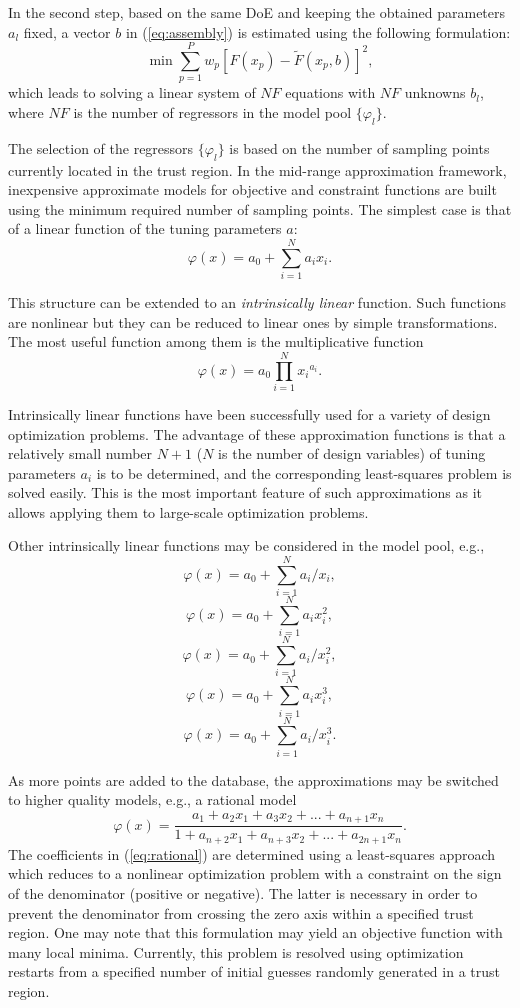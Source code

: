 \documentclass[runningheads,a4paper]{llncs}
\begin{document}
In the second step, based on the same DoE and keeping the obtained parameters
$a_l$ fixed, a vector $b$ in (\ref{eq:assembly}) is estimated using the
following formulation:
\[
\min \sum_{p=1}^P{w_{p}\left[ F(x_p)- \widetilde{F}(x_p,b) \right]^2},
\]
which leads to solving a linear system of $NF$ equations with $NF$ unknowns
$b_l$, where $NF$ is the number of regressors in the model pool
$\{\varphi_l\}$.

The selection of the regressors $\{\varphi_l\}$ is based on the number of
sampling points currently located in the trust region. In the mid-range
approximation framework, inexpensive approximate models for objective and
constraint functions are built using the minimum required number of sampling
points. The simplest case is that of a linear function of the tuning parameters
$a$:
\[
\varphi(x) = a_0 + \sum_{i=1}^N{a_i x_i}.
\]

This structure can be extended to an \textit{intrinsically linear} function.
Such functions are nonlinear but they can be reduced to linear ones by simple
transformations. The most useful function among them is the multiplicative
function
\[
\varphi(x) = a_0 \prod_{i=1}^N{x{_i}^{a_i}}.
\]

Intrinsically linear functions have been successfully used for a variety of
design optimization problems. The advantage of these approximation functions is
that a relatively small number $N+1$ ($N$ is the number of design variables) of
tuning parameters $a_i$ is to be determined, and the corresponding
least-squares problem is solved easily. This is the most important feature of
such approximations as it allows applying them to large-scale optimization
problems.

Other intrinsically linear functions may be considered in the model pool, e.g.,
\[
\varphi(x) = a_0 + \sum_{i=1}^N{a_i/x_i},
\]
\[
\varphi(x) = a_0 + \sum_{i=1}^N{a_i x_i^2},
\]
\[
\varphi(x) = a_0 + \sum_{i=1}^N{a_i/x_i^2},
\]
\[
\varphi(x) = a_0 + \sum_{i=1}^N{a_i x_i^3},
\]
\[
\varphi(x) = a_0 + \sum_{i=1}^N{a_i/x_i^3}.
\]

As more points are added to the database, the approximations may be switched to
higher quality models, e.g., a rational model
\begin{equation}\label{eq:rational}
\varphi(x) = \frac{a_1 + a_2x_1 + a_3x_2+...+a_{n+1}x_n}{1 + a_{n+2}x_1 + a_{n+3}x_2+...+a_{2n+1}x_n}.
\end{equation}
The coefficients in (\ref{eq:rational}) are determined using a least-squares
approach which reduces to a nonlinear optimization problem with a constraint on
the sign of the denominator (positive or negative). The latter is necessary in
order to prevent the denominator from crossing the zero axis within a specified
trust region. One may note that this formulation may yield an objective
function with many local minima. Currently, this problem is resolved using
optimization restarts from a specified number of initial guesses randomly
generated in a trust region.
\end{document}
